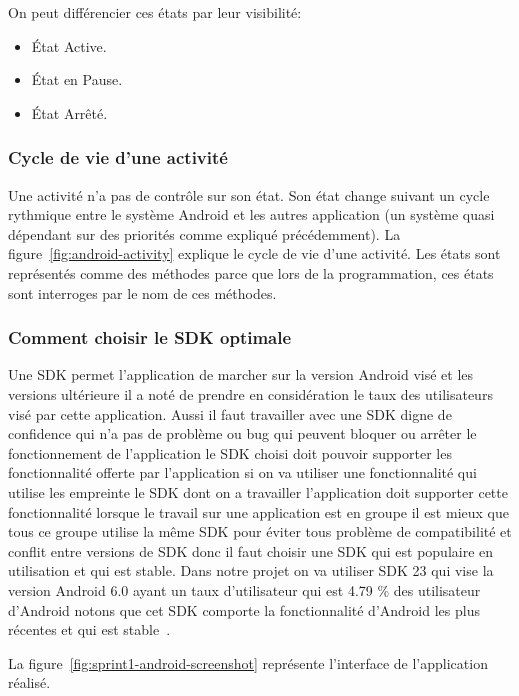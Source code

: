 On peut différencier ces états par leur visibilité:

\begin{itemize}
    \item État Active.
    \item État en Pause.
    \item État Arrêté.
\end{itemize}

\subsubsection{Cycle de vie d'une activité}

Une activité n'a pas de contrôle sur son état. Son état change suivant un cycle
rythmique entre le système Android et les autres application (un système quasi
dépendant sur des priorités comme expliqué précédemment). La
figure~\ref{fig:android-activity} explique le cycle de vie d'une activité. Les
états sont représentés comme des méthodes parce que lors de la programmation,
ces états sont interroges par le nom de ces méthodes.



\subsubsection{Comment choisir le SDK optimale}

Une SDK permet l'application de marcher sur la version Android visé et les
versions ultérieure il a noté de prendre en considération le taux des
utilisateurs visé par cette application. Aussi il faut travailler avec une SDK
digne de confidence qui n'a pas de problème ou bug qui peuvent bloquer ou
arrêter le fonctionnement de l'application le SDK choisi doit pouvoir supporter
les fonctionnalité offerte par l'application si on va utiliser une
fonctionnalité qui utilise les empreinte le SDK dont on a travailler
l'application doit supporter cette fonctionnalité lorsque le travail sur une
application est en groupe il est mieux que tous ce groupe utilise la même SDK
pour éviter tous problème de compatibilité et conflit entre versions de SDK
donc il faut choisir une SDK qui est populaire en utilisation et qui est
stable. Dans notre projet on va utiliser SDK 23 qui vise la version Android 6.0
ayant un taux d'utilisateur qui est 4.79 \% des utilisateur d'Android notons que
cet SDK comporte la fonctionnalité d'Android les plus récentes et qui est
stable~\cite{android-sdk}.

La figure~\ref{fig:sprint1-android-screenshot} représente l'interface de
l'application réalisé.

